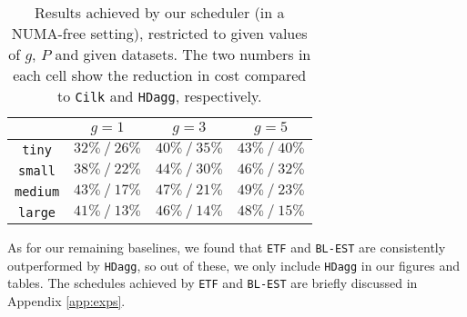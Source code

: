\documentclass[sigconf,nonacm]{acmart}
\begin{document}
\begin{table*}[ht]
    \centering
      \caption{Results achieved by our scheduler (in a NUMA-free setting), restricted to given values of $g$, $P$ and given datasets. The two numbers in each cell show the reduction in cost compared to \texttt{Cilk} and \texttt{HDagg}, respectively.}
  \hspace{0.01\textwidth}
    \begin{minipage}[b]{0.45\textwidth}
    \renewcommand{\arraystretch}{1.55}
    \begin{tabular}{c || c | c | c| }
     & $g=1$ & $g=3$ & $g=5$ \\ [0.5ex] 
     \hline\hline
     \texttt{tiny} & $32\% \: / \: 26\%$  & $40\% \: / \: 35\%$ & $43\% \: / \: 40\%$ \\ 
     \hline
     \texttt{small} & $38\% \: / \: 22\%$ & $44\% \: / \: 30\%$ & $46\% \: / \: 32\%$ \\
     \hline
     \texttt{medium} & $43\% \: / \: 17\%$ & $47\% \: / \: 21\%$ & $49\% \: / \: 23\%$ \\
     \hline
     \texttt{large} & $41\% \: / \: 13\%$ & $46\% \: / \: 14\%$ & $48\% \: / \: 15\%$ \\
     \hline
    \end{tabular}
  \end{minipage}
  \hfill
  \label{tab:base}
\end{table*}

As for our remaining baselines, we found that \texttt{ETF} and \texttt{BL-EST} are consistently outperformed by \texttt{HDagg}, so out of these, we only include \texttt{HDagg} in our figures and tables. The schedules achieved by \texttt{ETF} and \texttt{BL-EST} are briefly discussed in Appendix \ref{app:exps}.
\end{document}
